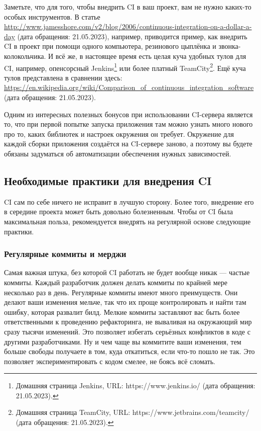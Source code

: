 \documentclass{../../text-style}
\begin{document}
Заметьте, что для того, чтобы внедрить CI в ваш проект, вам не нужно каких-то особых инструментов. В статье \url{http://www.jamesshore.com/v2/blog/2006/continuous-integration-on-a-dollar-a-day} (дата обращения: 21.05.2023), например, приводится пример, как внедрить CI в проект при помощи одного компьютера, резинового цыплёнка и звонка-колокольчика. И всё же, в настоящее время есть целая куча удобных тулов для CI, например, опенсорсный Jenkins\footnote{Домашняя страница Jenkins, URL: https://www.jenkins.io/ (дата обращения: 21.05.2023).} или более платный TeamCity\footnote{Домашняя страница TeamCity, URL: https://www.jetbrains.com/teamcity/ (дата обращения: 21.05.2023).}. Ещё куча тулов представлена в сравнении здесь: \url{https://en.wikipedia.org/wiki/Comparison_of_continuous_integration_software} (дата обращения: 21.05.2023).

Одним из интересных полезных бонусов при использовании CI-сервера является то, что при первой попытке запуска приложения там можно узнать много нового про то, каких библиотек и настроек окружения он требует. Окружение для каждой сборки приложения создаётся на CI-сервере заново, а поэтому вы будете обязаны задуматься об автоматизации обеспечения нужных зависимостей.

\subsection{Необходимые практики для внедрения CI}

CI сам по себе ничего не исправит в лучшую сторону. Более того, внедрение его в середине проекта может быть довольно болезненным. Чтобы от CI была максимальная польза, рекомендуется внедрять на регулярной основе следующие практики.

\subsubsection{Регулярные коммиты и мерджи}

Самая важная штука, без которой CI работать не будет вообще никак --- частые коммиты. Каждый разработчик должен делать коммиты по крайней мере несколько раз в день. Регулярные коммиты имеют много преимуществ. Они делают ваши изменения мельче, так что их проще контролировать и найти там ошибку, которая развалит билд. Мелкие коммиты заставляют вас быть более ответственными к проведению рефакторинга, не вываливая на окружающий мир сразу тысячи изменений. Это позволяет избегать серьёзных конфликтов в коде с другими разработчиками. Ну и чем чаще вы коммитите ваши изменения, тем больше свободы получаете в том, куда откатиться, если что-то пошло не так. Это позволяет экспериментировать с кодом смелее, не боясь всё сломать.
\end{document}
